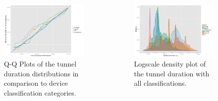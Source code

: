 \documentclass{beamer}
\begin{document}
\begin{frame}
	\begin{columns}[T]
		\begin{figure}
			\centering
			\includegraphics[width=\columnwidth]{../../chapters/04-mobilenets/images/R-duration-qq-category-comparison.pdf}
			\caption{Q-Q Plots of the tunnel duration distributions in comparison to device classification categories.}
		\end{figure}

		\begin{figure}
			\includegraphics[width=\columnwidth]{../../chapters/04-mobilenets/images/R-duration-classification-density.pdf}
			\caption{Logscale density plot of the tunnel duration with all classifications.}
		\end{figure}
	\end{columns}
\end{frame}
\end{document}
